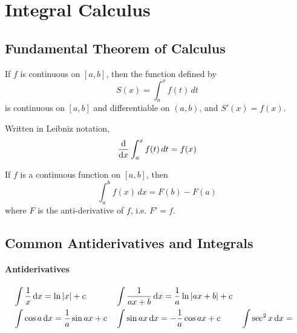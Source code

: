 \section{Integral Calculus}
\subsection{Fundamental Theorem of Calculus}
\begin{thrm}
	\label{ftc}
	If $f$ is continuous on $[a,b]$, then the function defined by
	$$S(x)=\int _{ a }^{ x }{ f(t)\, dt }$$
	is continuous on $[a,b]$ and differentiable on $(a,b)$, and $S'(x)=f(x)$.
\end{thrm}
Written in Leibniz notation,
$$\frac{\mathrm{d}}{\mathrm{d}x}\int_{a}^{x} f(t)\, dt = f(x)$$

\begin{thrm}
	If $f$ is a continuous function on $[a,b]$, then
	$$\int _{ a }^{ b }{ f(x)\, dx=F(b)-F(a)}$$
	where $F$ is the anti-derivative of $f$, i.e. $F'=f$.
\end{thrm}
\subsection{Common Antiderivatives and Integrals}
\paragraph{Antiderivatives}
\begin{align*}
&\int\frac{1}{x}\, \mathrm{d}x = \ln|x| + c & &\int{\frac{1}{ax + b}\, \mathrm{d}x} = \frac{1}{a}\ln|ax+b| + c \\
&\int \cos a \, \mathrm{d}x= \frac1a \sin ax + c & &\int \sin ax\, \mathrm{d}x= - \frac1a \cos ax + c  &  &\int \sec^2x \, \mathrm{d}x =
\end{align*}